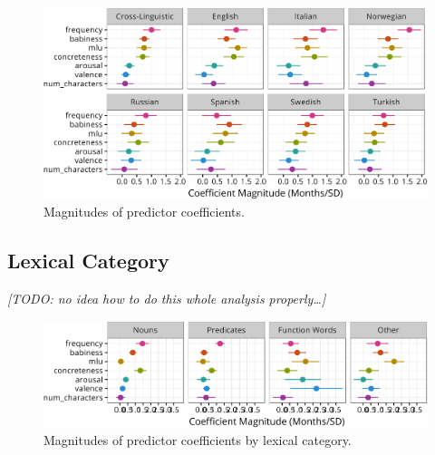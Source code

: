 \documentclass[10pt, letterpaper]{article}
\newenvironment{CodeChunk}{}{}
\begin{document}
\begin{CodeChunk}
\begin{figure}[tb]

{\centering \includegraphics{figs/coefs-1} 

}

\caption[Magnitudes of predictor coefficients]{Magnitudes of predictor coefficients.}\label{fig:coefs}
\end{figure}
\end{CodeChunk}

\subsection{Lexical Category}\label{lexical-category}

\emph{{[}TODO: no idea how to do this whole analysis
properly\ldots{}{]}}

\begin{CodeChunk}
\begin{figure}[tb]

{\centering \includegraphics{figs/coefs_lexcat-1} 

}

\caption[Magnitudes of predictor coefficients by lexical category]{Magnitudes of predictor coefficients by lexical category.}\label{fig:coefs_lexcat}
\end{figure}
\end{CodeChunk}

\newpage
\end{document}

